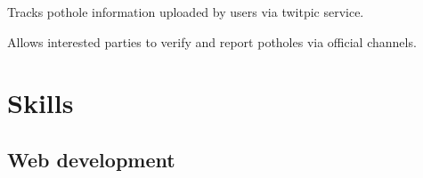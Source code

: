 \documentclass{resume}
\begin{document}
\begin{compactitem}
  \item Tracks pothole information uploaded by users via twitpic service.
  \item Allows interested parties to verify and report potholes via official channels.
\end{compactitem}

\section{Skills}

\subsection{Web development}
\end{document}
